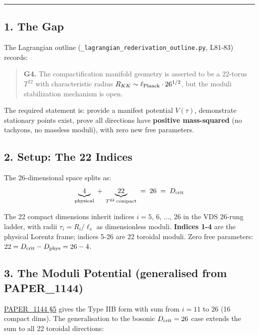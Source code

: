 \documentclass[
]{article}
\begin{document}
\begin{center}\rule{0.5\linewidth}{0.5pt}\end{center}

\subsection{1. The Gap}\label{the-gap}

The Lagrangian outline (\texttt{\_lagrangian\_rederivation\_outline.py},
L81-83) records:

\begin{quote}
\textbf{G4.} The compactification manifold geometry is asserted to be a
22-torus \(T^{22}\) with characteristic radius
\(R_{KK} \sim \ell_{\rm Planck} \cdot 26^{1/2}\), but the moduli
stabilization mechanism is open.
\end{quote}

The required statement is: provide a manifest potential \(V(\tau)\),
demonstrate stationary points exist, prove all directions have
\textbf{positive mass-squared} (no tachyons, no massless moduli), with
zero new free parameters.

\subsection{2. Setup: The 22 Indices}\label{setup-the-22-indices}

The 26-dimensional space splits as:
\[\underbrace{4}_{\rm physical} \;+\; \underbrace{22}_{T^{22}\;\rm compact} \;=\; 26 \;=\; D_{\rm crit}\]

The 22 compact dimensions inherit indices \(i = 5,\,6,\,\dots,\,26\) in
the VDS 26-rung ladder, with radii \(\tau_i = R_i/\ell_s\) as
dimensionless moduli. \textbf{Indices 1-4} are the physical Lorentz
frame; indices 5-26 are 22 toroidal moduli. Zero free parameters: \(22 =
D_{\rm crit} - D_{\rm phys} = 26 - 4\).

\subsection{3. The Moduli Potential (generalised from
PAPER\_1144)}\label{the-moduli-potential-generalised-from-paper_1144}

\href{whitepapers/PAPER_1144_Type_IIB_Superstring_SCm_10D_Compactification.md\#L62}{PAPER\_1144
§5} gives the Type IIB form with sum from \(i=11\) to \(26\) (16 compact
dims). The generalisation to the bosonic \(D_{\rm crit}=26\) case
extends the sum to all 22 toroidal directions:
\end{document}
